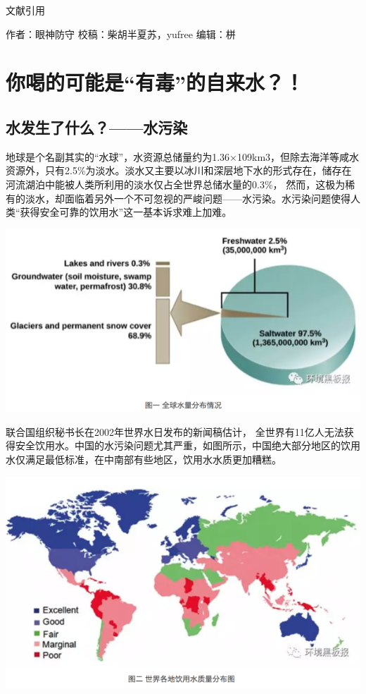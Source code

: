 \documentclass[
]{book}
\begin{document}
文献引用

作者：眼神防守
校稿：柴胡半夏苏，yufree
编辑：栟

\hypertarget{ux4f60ux559dux7684ux53efux80fdux662fux6709ux6bd2ux7684ux81eaux6765ux6c34}{%
\section{你喝的可能是``有毒''的自来水？！}\label{ux4f60ux559dux7684ux53efux80fdux662fux6709ux6bd2ux7684ux81eaux6765ux6c34}}

\hypertarget{ux6c34ux53d1ux751fux4e86ux4ec0ux4e48ux6c34ux6c61ux67d3}{%
\subsection{水发生了什么？------水污染}\label{ux6c34ux53d1ux751fux4e86ux4ec0ux4e48ux6c34ux6c61ux67d3}}

地球是个名副其实的``水球''，水资源总储量约为1.36×109km3，但除去海洋等咸水资源外，只有2.5\%为淡水。淡水又主要以冰川和深层地下水的形式存在，储存在河流湖泊中能被人类所利用的淡水仅占全世界总储水量的0.3\%， 然而，这极为稀有的淡水，却面临着另外一个不可忽视的严峻问题------水污染。水污染问题使得人类``获得安全可靠的饮用水''这一基本诉求难上加难。

\includegraphics[width=8.33in]{images/dushui1}

联合国组织秘书长在2002年世界水日发布的新闻稿估计， 全世界有11亿人无法获得安全饮用水。中国的水污染问题尤其严重，如图所示，中国绝大部分地区的饮用水仅满足最低标准，在中南部有些地区，饮用水水质更加糟糕。

\includegraphics[width=8.33in]{images/dushui2}
\end{document}
